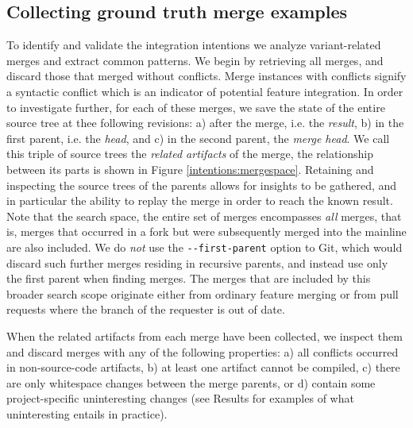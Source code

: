 \subsection{Collecting ground truth merge examples}
To identify and validate the integration intentions we analyze variant-related merges and extract common patterns. We begin by retrieving all merges, and discard those that merged without conflicts. Merge instances with conflicts signify a syntactic conflict which is an indicator of potential feature integration. In order to investigate further, for each of these merges, we save the state of the entire source tree at thee following revisions:  
a) after the merge, i.e. the \textit{result},
b) in the first parent, i.e. the \textit{head}, and
c) in the second parent, the \textit{merge head}. We call this triple of source trees the \textit{related artifacts} of the merge, the relationship between its parts is shown in Figure \ref{intentions:mergespace}. Retaining and inspecting the source trees of the parents allows for insights to be gathered, and in particular the ability to replay the merge in order to reach the known result. Note that the search space, the entire set of merges encompasses \textit{all} merges, that is, merges that occurred in a fork but were subsequently merged into the mainline are also included. We do \textit{not} use the \texttt{-{}-first-parent} option to Git, which would discard such further merges residing in recursive parents, and instead use only the first parent when finding merges. The merges that are included by this broader search scope originate either from ordinary feature merging or from pull requests where the branch of the requester is out of date.%

When the related artifacts from each merge have been collected, we inspect them and discard merges with any of the following properties: 
a) all conflicts occurred in non-source-code artifacts, b) at least one artifact cannot be compiled, c) there are only whitespace changes between the merge parents, or d) contain some project-specific uninteresting changes (see Results  for examples of what uninteresting entails in practice).

